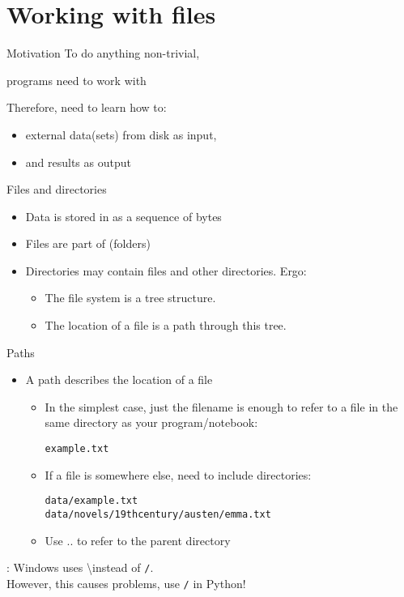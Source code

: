 \documentclass[aspectratio=169,usenames,dvipsnames]{beamer}
\begin{document}
\section{Working with files}
\frame{\tableofcontents[currentsection]}

\begin{frame}{Motivation}
    To do anything non-trivial,

    programs need to work with 

    \pause
    Therefore, need to learn how to:

	\begin{itemize}
		\item {} external data(sets) from disk as input,
		\item and  results as output
	\end{itemize}

\end{frame}


\begin{frame}{Files and directories}
    \begin{itemize}
        \item Data is stored in  as a sequence of bytes
        \item Files are part of  (folders)
        \item Directories may contain files and other directories. Ergo:
            \begin{itemize}
                \item The file system is a tree structure.
                \item The location of a file is a path through this tree.
            \end{itemize}
    \end{itemize}
\end{frame}

\begin{frame}{Paths}
    \begin{itemize}
        \item A path describes the location of a file
		\begin{itemize}
        \item In the simplest case, just the filename is enough to
            refer to a file in the same directory as your program/notebook:

            \texttt{example.txt}

        \item If a file is somewhere else, need to include directories:

            \texttt{data/example.txt}\\
            \texttt{data/novels/19thcentury/austen/emma.txt}
		\item Use .. to refer to the parent directory
		\end{itemize}
    \end{itemize}
    : Windows uses \textbackslash instead of \texttt{/}. \\
        However, this causes problems, use \texttt{/} in Python!
\end{frame}
\end{document}

